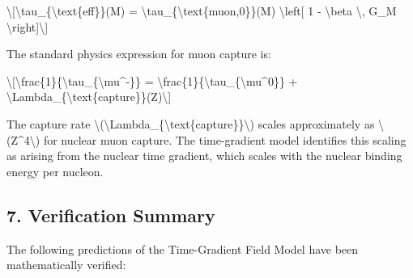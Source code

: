 \documentclass[
  10pt,
]{article}
\begin{document}
\textbackslash{[}\textbackslash tau\_\{\textbackslash text\{eff\}\}(M) =
\textbackslash tau\_\{\textbackslash text\{muon,0\}\}(M)
\textbackslash left{[} 1 - \textbackslash beta \textbackslash, G\_M
\textbackslash right{]}\textbackslash{]}

The standard physics expression for muon capture is:

\textbackslash{[}\textbackslash frac\{1\}\{\textbackslash tau\_\{\textbackslash mu\^{}-\}\}
=
\textbackslash frac\{1\}\{\textbackslash tau\_\{\textbackslash mu\^{}0\}\}
+
\textbackslash Lambda\_\{\textbackslash text\{capture\}\}(Z)\textbackslash{]}

The capture rate
\textbackslash(\textbackslash Lambda\_\{\textbackslash text\{capture\}\}\textbackslash)
scales approximately as \textbackslash(Z\^{}4\textbackslash) for nuclear
muon capture. The time-gradient model identifies this scaling as arising
from the nuclear time gradient, which scales with the nuclear binding
energy per nucleon.

\hypertarget{verification-summary}{%
\subsection{7. Verification Summary}\label{verification-summary}}

The following predictions of the Time-Gradient Field Model have been
mathematically verified:
\end{document}
